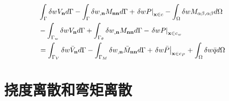 \begin{equation}
        \begin{split}\label{Pweakform2}
            &\int_\Gamma  {\delta w{V_{\bf{n}}}d\Gamma } - \int_\Gamma  {\delta {w_{,{\bf{n}}}}{M_{{\bf{nn}}}}d\Gamma }  + {\left. {\delta wP} \right|_{{\bf{x}} \in c}} - \int_\Omega  {\delta w{M_{\alpha \beta ,\alpha\beta}}d\Omega }\\
            &- \int_{{\Gamma _w}} {\delta w{V_{\bf{n}}}d\Gamma }  + \int_{{\Gamma _\theta }} {\delta {w_{,{\bf{n}}}}{M_{{\bf{nn}}}}d\Gamma }  - {\left. {\delta wP} \right|_{{\bf{x}} \in {c_w}}}\\
            &= \int_{{\Gamma _V}} {\delta w{{\bar V}_{\bf{n}}}d\Gamma }  - \int_{{\Gamma _M}} {\delta {w_{,{\bf{n}}}}{{\bar M}_{{\bf{nn}}}}d\Gamma }  + {\left. {\delta w\bar P} \right|_{{\bf{x}} \in {c_P}}} + \int_\Omega  {\delta w\bar qd\Omega} 
    \end{split}
\end{equation} 
\section{挠度离散和弯矩离散}
